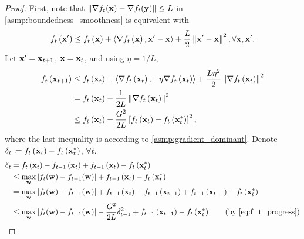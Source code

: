 \begin{proof}
First, note that $\left\| \nabla f_t({\mathbf{x}} ) - \nabla f_t({\mathbf{y}}) \right\| \le L $ in \cref{asmp:boundedness_smoothness} is equivalent with
\begin{equation*}
\begin{split}
    f_t\left({\mathbf{x}}^\prime\right) \le f_t\left({\mathbf{x}}\right) + \left\langle \nabla f_t\left({\mathbf{x}}\right) , {\mathbf{x}}^\prime - {\mathbf{x}} \right\rangle +  \frac{L}{2} \left\| {\mathbf{x}}^\prime - {\mathbf{x}} \right\|^2, \forall {\mathbf{x}}, {\mathbf{x}}^\prime.
\end{split}
\end{equation*}
Let ${\mathbf{x}}^\prime = {\mathbf{x}}_{t+1}$, ${\mathbf{x}} = {\mathbf{x}}_{t}$, and using $\eta = 1/L$,
\begin{equation}
\label{eq:f_t_progress}
\begin{split}
    f_t\left({\mathbf{x}}_{t+1}\right) &\le f_t\left({\mathbf{x}}_{t}\right) + \left\langle \nabla f_t\left({\mathbf{x}}_t\right) , - \eta \nabla f_t\left({\mathbf{x}}_t\right) \right\rangle +  \frac{L \eta^2}{2} \left\| \nabla f_t\left({\mathbf{x}}_t\right) \right\|^2 \\
    &= f_t\left({\mathbf{x}}_{t}\right) - \frac{1}{2 L} \left\| \nabla f_t\left({\mathbf{x}}_t\right) \right\|^2 \\
    &\le f_t\left({\mathbf{x}}_{t}\right) - \frac{G^2}{2 L} \left[ f_t\left({\mathbf{x}}_t\right) - f_t\left({\mathbf{x}}_t^*\right) \right]^2,
\end{split}
\end{equation}
where the last inequality is according to \cref{asmp:gradient_dominant}. Denote $\delta_t \coloneqq f_t\left({\mathbf{x}}_t\right) - f_t\left( {\mathbf{x}}_t^* \right)$, $\forall t$.
\begin{equation*}
\begin{split}
    \delta_t &= f_t\left(\rvx_t\right) - f_{t-1}\left(\rvx_t\right) + f_{t-1}\left(\rvx_t\right) - f_t\left( \rvx_t^* \right) \\
    &\le \max\limits_{\rvw}{\left| f_{t}(\rvw) - f_{t-1}(\rvw) \right| } + f_{t-1}\left(\rvx_t\right) - f_t\left( \rvx_t^* \right) \\
    &= \max\limits_{\rvw}{\left| f_{t}(\rvw) - f_{t-1}(\rvw) \right| } + f_{t-1}\left(\rvx_t\right) - f_{t-1}\left(\rvx_{t-1}\right) + f_{t-1}\left(\rvx_{t-1}\right) - f_t\left( \rvx_t^* \right) \\
    &\le \max\limits_{\rvw}{\left| f_{t}(\rvw) - f_{t-1}(\rvw) \right| } - \frac{G^2}{2L} \delta_{t-1}^2 + f_{t-1}\left(\rvx_{t-1}\right) - f_t\left( \rvx_t^* \right) \qquad \left( \text{by \cref{eq:f_t_progress}} \right) \\

\end{split}
\end{equation*}
\end{proof}
